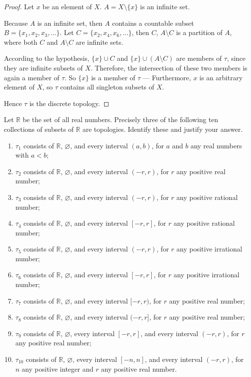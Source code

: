 \begin{proof}
    Let $x$ be an element of $X$. $A = X\setminus\{ x \}$ is an infinite set.

    Because $A$ is an infinite set, then $A$ contains a countable subset $B = \{ x_{1}, x_{2}, x_{3}, \ldots \}$. Let $C = \{ x_{2}, x_{4}, x_{6}, \ldots \}$, then $C$, $A\setminus C$ is a partition of $A$, where both $C$ and $A\setminus C$ are infinite sets.

    According to the hypothesis, $\{ x \}\cup C$ and $\{ x \}\cup (A\setminus C)$ are members of $\tau$, since they are infinite subsets of $X$. Therefore, the intersection of these two members is again a member of $\tau$. So $\{ x \}$ is a member of $\tau$ --- Furthermore, $x$ is an arbitrary element of $X$, so $\tau$ contains all singleton subsets of $X$.

    Hence $\tau$ is the discrete topology.
\end{proof}
\newpage

\begin{exercise}
    Let $\mathbb{R}$ be the set of all real numbers. Precisely three of the following ten collections of subsets of $\mathbb{R}$ are topologies. Identify these and justify your answer.
    \begin{enumerate}[label={(\roman*)}]
        \item $\tau_{1}$ consists of $\mathbb{R}$, $\varnothing$, and every interval $(a, b)$, for $a$ and $b$ any real numbers with $a < b$;
        \item $\tau_{2}$ consists of $\mathbb{R}$, $\varnothing$, and every interval $(-r, r)$, for $r$ any positive real number;
        \item $\tau_{3}$ consists of $\mathbb{R}$, $\varnothing$, and every interval $(-r, r)$, for $r$ any positive rational number;
        \item $\tau_{4}$ consists of $\mathbb{R}$, $\varnothing$, and every interval $[-r, r]$, for $r$ any positive rational number;
        \item $\tau_{5}$ consists of $\mathbb{R}$, $\varnothing$, and every interval $(-r, r)$, for $r$ any positive irrational number;
        \item $\tau_{6}$ consists of $\mathbb{R}$, $\varnothing$, and every interval $[-r, r]$, for $r$ any positive irrational number;
        \item $\tau_{7}$ consists of $\mathbb{R}$, $\varnothing$, and every interval $[-r, r)$, for $r$ any positive real number;
        \item $\tau_{8}$ consists of $\mathbb{R}$, $\varnothing$, and every interval $(-r, r]$, for $r$ any positive real number;
        \item $\tau_{9}$ consists of $\mathbb{R}$, $\varnothing$, every interval $[-r, r]$, and every interval $(-r, r)$, for $r$ any positive real number;
        \item $\tau_{10}$ consists of $\mathbb{R}$, $\varnothing$, every interval $[-n, n]$, and every interval $(-r, r)$, for $n$ any positive integer and $r$ any positive real number.
    \end{enumerate}
\end{exercise}

